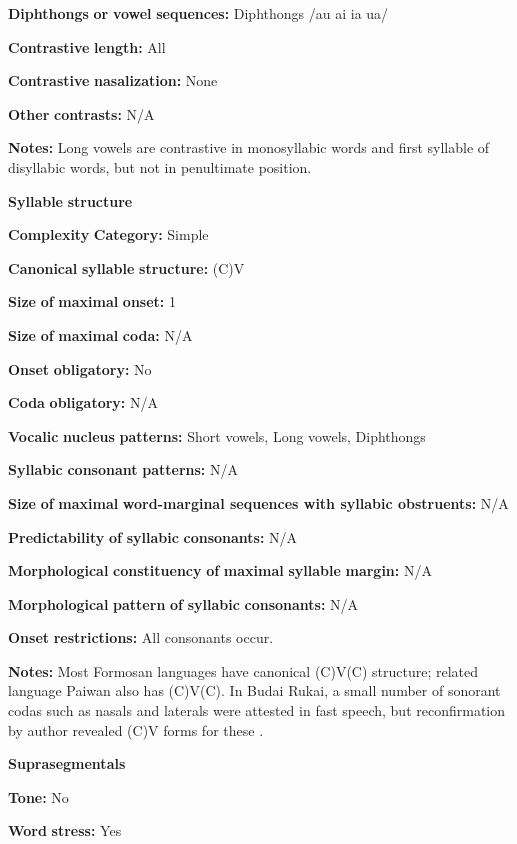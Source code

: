 \begin{styleBody}
\textbf{Diphthongs} \textbf{or} \textbf{vowel} \textbf{sequences:} Diphthongs /au ai ia ua/

\textbf{Contrastive} \textbf{length:} All

\textbf{Contrastive} \textbf{nasalization:} None

\textbf{Other} \textbf{contrasts:} N/A

\textbf{Notes:} Long vowels are contrastive in monosyllabic words and first syllable of disyllabic words, but not in penultimate position.

\textbf{Syllable} \textbf{structure}

\textbf{Complexity} \textbf{Category:} Simple

\textbf{Canonical} \textbf{syllable} \textbf{structure:} (C)V \citep[211-18]{Chen2006}

\textbf{Size} \textbf{of} \textbf{maximal} \textbf{onset:} 1

\textbf{Size} \textbf{of} \textbf{maximal} \textbf{coda:} N/A

\textbf{Onset} \textbf{obligatory:} No

\textbf{Coda} \textbf{obligatory:} N/A

\textbf{Vocalic} \textbf{nucleus} \textbf{patterns:} Short vowels, Long vowels, Diphthongs

\textbf{Syllabic} \textbf{consonant} \textbf{patterns:} N/A

\textbf{Size} \textbf{of} \textbf{maximal} \textbf{word{}-marginal sequences with syllabic obstruents:} N/A

\textbf{Predictability} \textbf{of} \textbf{syllabic} \textbf{consonants:} N/A

\textbf{Morphological} \textbf{constituency} \textbf{of} \textbf{maximal} \textbf{syllable} \textbf{margin:} N/A

\textbf{Morphological} \textbf{pattern} \textbf{of} \textbf{syllabic} \textbf{consonants:} N/A

\textbf{Onset} \textbf{restrictions:} All consonants occur.

\textbf{Notes:} Most Formosan languages have canonical (C)V(C) structure; related language Paiwan also has (C)V(C). In Budai Rukai, a small number of sonorant codas such as nasals and laterals were attested in fast speech, but reconfirmation by author revealed (C)V forms for these \citep[213]{Chen2006}.

\textbf{Suprasegmentals}

\textbf{Tone:} No

\textbf{Word} \textbf{stress:} Yes


\end{styleBody}

